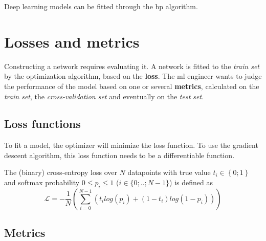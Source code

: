 Deep learning models can be fitted through the \acrfull{bp} algorithm. 

\section{Losses and metrics}

Constructing a network requires evaluating it. 
A network is fitted to the \textit{train set} by the optimization algorithm, based on the \textbf{loss}.
The \acrshort{ml} engineer wants to judge the performance of the model based on one or several \textbf{metrics}, calculated on the \textit{train set}, the \textit{cross-validation set} and eventually on the \textit{test set}.

\subsection{Loss functions}

To fit a model, the optimizer will minimize the loss function.
To use the gradient descent algorithm, this loss function needs to be a differentiable function.

The (binary) cross-entropy loss over $N$ datapoints with true value $t_i \in \left\{0;1\right\}$ and softmax probability $0 \leq p_i \leq 1$ ($i\in \{0;..;N-1\}$) is defined as 
\begin{equation}
    \mathcal{L} = -\frac{1}{N} \left(  
        \sum^{N-1}_{i=0} \left(
            t_i log(p_i) + (1 - t_i) log( 1 - p_i )
        \right)
     \right)
\end{equation}

\subsection{Metrics}

